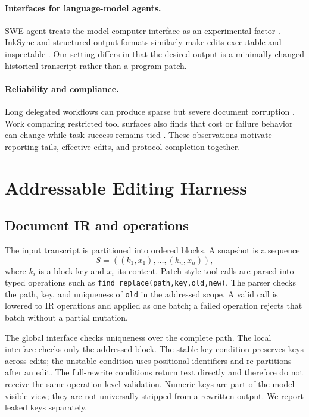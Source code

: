 \documentclass{article}
\begin{document}
\paragraph{Interfaces for language-model agents.} SWE-agent treats the model-computer interface as an experimental factor \citep{yang2024sweagent}. InkSync and structured output formats similarly make edits executable and inspectable \citep{laban2023inksync,cheng2026diff}. Our setting differs in that the desired output is a minimally changed historical transcript rather than a program patch.

\paragraph{Reliability and compliance.} Long delegated workflows can produce sparse but severe document corruption \citep{laban2026delegate}. Work comparing restricted tool surfaces also finds that cost or failure behavior can change while task success remains tied \citep{yang2026executecode}. These observations motivate reporting tails, effective edits, and protocol completion together.

\section{Addressable Editing Harness}
\subsection{Document IR and operations}
The input transcript is partitioned into ordered blocks. A snapshot is a sequence
\[
 S=((k_1,x_1),\ldots,(k_n,x_n)),
\]
where $k_i$ is a block key and $x_i$ its content. Patch-style tool calls are parsed into typed operations such as \texttt{find\_replace(path,key,old,new)}. The parser checks the path, key, and uniqueness of \texttt{old} in the addressed scope. A valid call is lowered to IR operations and applied as one batch; a failed operation rejects that batch without a partial mutation.

The global interface checks uniqueness over the complete path. The local interface checks only the addressed block. The stable-key condition preserves keys across edits; the unstable condition uses positional identifiers and re-partitions after an edit. The full-rewrite conditions return text directly and therefore do not receive the same operation-level validation. Numeric keys are part of the model-visible view; they are not universally stripped from a rewritten output. We report leaked keys separately.
\end{document}
